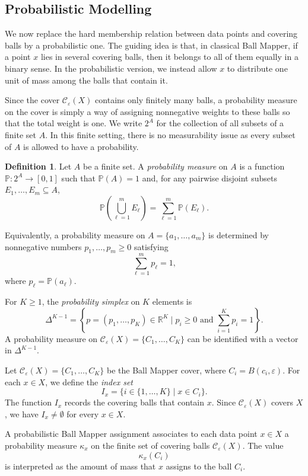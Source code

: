 \documentclass[9pt,a4paper,twocolumn,twoside]{extarticle}
\theoremstyle{definition}
\newtheorem{definition}[theorem]{Definition}
\begin{document}
\subsection{Probabilistic Modelling}

We now replace the hard membership relation between data points and covering balls by a probabilistic one. The guiding idea is that, in classical Ball Mapper, if a point $x$ lies in several covering balls, then it belongs to all of them equally in a binary sense. In the probabilistic version, we instead allow $x$ to distribute one unit of mass among the balls that contain it.

Since the cover $\mathcal C_\varepsilon(X)$ contains only finitely many balls, a probability measure on the cover is simply a way of assigning nonnegative weights to these balls so that the total weight is one. We write $2^A$ for the collection of all subsets of a finite set $A$. In this finite setting, there is no measurability issue as every subset of $A$ is allowed to have a probability.

\begin{definition}
Let $A$ be a finite set. A \emph{probability measure} on $A$ is a function $\mathbb P:2^A\to[0,1]$ such that $\mathbb P(A)=1$ and, for any pairwise disjoint subsets $E_1,\dots,E_m\subseteq A$,
\[
\mathbb P\left(\bigcup_{\ell=1}^m E_\ell\right) = \sum_{\ell=1}^m \mathbb P(E_\ell).
\]
\end{definition}

Equivalently, a probability measure on $A=\{a_1,\dots,a_m\}$ is determined by nonnegative numbers $p_1,\dots,p_m\ge 0$ satisfying
\[
\sum_{\ell=1}^m p_\ell=1,
\]
where $p_\ell=\mathbb P({a_\ell})$.

For $K\ge 1$, the \emph{probability simplex} on $K$ elements is
\[
\Delta^{K-1} =  \left\{p=(p_1,\dots,p_K)\in\mathbb R^K \mid p_i\ge 0 \text{ and } \sum_{i=1}^K p_i=1 \right\}.
\]
A probability measure on $\mathcal C_\varepsilon(X)=\{C_1,\dots,C_K\}$ can be identified with a vector in $\Delta^{K-1}$.

Let $\mathcal C_\varepsilon(X) = \{C_1,\dots,C_K\}$ be the Ball Mapper cover, where $C_i=B(c_i,\varepsilon)$. For each $x\in X$, we define the \emph{index set}
\[
I_x= \{i \in \{1,\dots,K\} \mid x\in C_i\}.
\]
The function $I_x$ records the covering balls that contain $x$. Since $\mathcal C_\varepsilon(X)$ covers $X$, we have $I_x \neq \emptyset$ for every $x \in X$.

A probabilistic Ball Mapper assignment associates to each data point $x\in X$ a probability measure $\kappa_x$ on the finite set of covering balls $\mathcal C_\varepsilon(X)$. The value
\[
\kappa_x({C_i})
\]
is interpreted as the amount of mass that $x$ assigns to the ball $C_i$.
\end{document}
